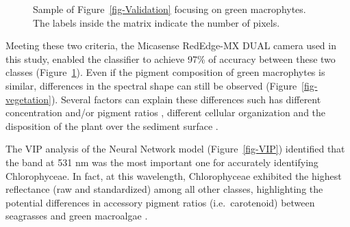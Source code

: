 \documentclass[
  number]{elsarticle}
\begin{document}
\label{cell-fig-ValidationGreen}
\begin{figure}[H]


\caption{\label{fig-ValidationGreen}Sample of
Figure~\ref{fig-Validation} focusing on green macrophytes. The labels
inside the matrix indicate the number of pixels.}

\end{figure}%

Meeting these two criteria, the Micasense RedEdge-MX DUAL camera used in
this study, enabled the classifier to achieve 97\% of accuracy between
these two classes (Figure~\ref{fig-ValidationGreen}). Even if the
pigment composition of green macrophytes is similar, differences in the
spectral shape can still be observed (Figure~\ref{fig-vegetation}).
Several factors can explain these differences such has different
concentration and/or pigment ratios \citep{bargain2013seasonal},
different cellular organization and the disposition of the plant over
the sediment surface \citetext{\citealp[ ]{beach1997vivo}; \citealp[
]{kirk1994light}; \citealp{hedley2018influence}}.

The VIP analysis of the Neural Network model (Figure~\ref{fig-VIP})
identified that the band at 531 nm was the most important one for
accurately identifying Chlorophyceae. In fact, at this wavelength,
Chlorophyceae exhibited the highest reflectance (raw and standardized)
among all other classes, highlighting the potential differences in
accessory pigment ratios (i.e.~carotenoid) between seagrasses and green
macroalgae \citep{repolho2017seagrass}.
\end{document}
